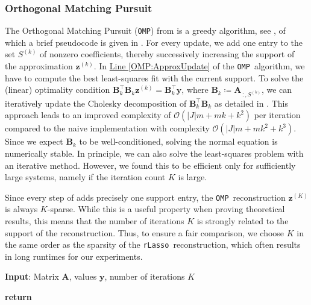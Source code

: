 \documentclass[11pt,reqno, a4paper]{article}
\numberwithin{equation}{section}
\newcommand{\rlasso}{\texttt{rLasso}}
\newcommand{\omp}{\texttt{OMP}}
\begin{document}
\subsubsection{Orthogonal Matching Pursuit}

The Orthogonal Matching Pursuit (\omp) from  is a greedy algorithm, see \cite{KuRa08,Zha11}, of which a brief pseudocode is given in .
For every update, we add one entry to the set \(S^{(k)}\) of nonzero coefficients, thereby successively increasing the support of the approximation \(\mathbf{z}^{(k)}\).
In \hyperref[OMP:ApproxUpdate]{Line \ref*{OMP:ApproxUpdate}} of the \omp \ algorithm, we have to compute the best least-squares fit with the current support.
To solve the (linear) optimality condition $\mathbf B_k^{\top} \mathbf{B}_k \mathbf{z}^{(k)} = \mathbf{B}_k^{\top} \mathbf{y}$, where $\mathbf B_k \coloneqq \mathbf{A}_{\,:,S^{(k)}}$, we can iteratively update the Cholesky decomposition of $\mathbf{B}_k^{\top} \mathbf{B}_k$ as detailed in \cite{StuChr2012}.
This approach leads to an improved complexity of $\mathcal O(\lvert J \rvert m + mk + k^2)$ per iteration compared to the naive implementation with complexity $\mathcal O(\lvert J \rvert m + m k^2 + k^3)$.
Since we expect $\mathbf B_k$ to be well-conditioned, solving the normal equation is numerically stable.
In principle, we can also solve the least-squares problem with an iterative method.
However, we found this to be efficient only for sufficiently large systems, namely if the iteration count $K$ is large.

Since every step of  adds precisely one support entry, the \omp \ reconstruction \(\mathbf{z}^{(K)}\) is always \(K\)-sparse.
While this is a useful property when proving theoretical results, this means that the number of iterations $K$ is strongly related to the support of the reconstruction.
Thus, to ensure a fair comparison, we choose $K$ in the same order as the sparsity of the \rlasso \ reconstruction, which often results in long runtimes for our experiments.

\begin{algorithm}[H]
\caption{\omp}\label{alg:OMP}
\textbf{Input}: Matrix \(\mathbf{A}\), values $\mathbf{y}$, number of iterations $K$
\begin{algorithmic}[1]
\State {}
\State {}
\State {}
\State {}\label{OMP:ApproxUpdate}
\EndFor
\EndFunction
\State \textbf{return} 
\end{algorithmic}
\end{algorithm}
\end{document}
